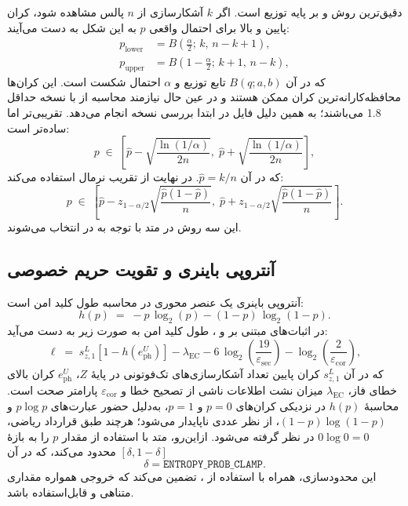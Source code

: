  دقیق‌ترین روش و بر پایه توزیع  است. اگر $k$ آشکارسازی از $n$ پالس مشاهده شود، کران پایین و بالا برای احتمال واقعی $p$ به این شکل به دست می‌آیند:
\begin{align}
	p_{\text{lower}} &= B\!\left(\frac{\alpha}{2};\, k,\, n-k+1\right), \\
	p_{\text{upper}} &= B\!\left(1-\frac{\alpha}{2};\, k+1,\, n-k\right),
\end{align}
که در آن $B(q; a, b)$ تابع  توزیع  و $\alpha$ احتمال شکست است. این کران‌ها محافظه‌کارانه‌ترین کران ممکن هستند و در عین حال نیازمند محاسبه  از  با نسخه حداقل 1.8 می‌باشند؛ به همین دلیل فایل در ابتدا بررسی نسخه انجام می‌دهد.  تقریبی‌تر اما ساده‌تر است:
\begin{equation}
	p \;\in\; \left[\hat{p} - \sqrt{\frac{\ln(1/\alpha)}{2n}},\; \hat{p} + \sqrt{\frac{\ln(1/\alpha)}{2n}}\right],
\end{equation}
که در آن $\hat{p} = k/n$. در نهایت  از تقریب نرمال استفاده می‌کند:
\begin{equation}
	p \;\in\; \left[\hat{p} - z_{1-\alpha/2}\sqrt{\frac{\hat{p}(1-\hat{p})}{n}},\; \hat{p} + z_{1-\alpha/2}\sqrt{\frac{\hat{p}(1-\hat{p})}{n}}\right].
\end{equation}
این سه روش در متد  با توجه به  در  انتخاب می‌شوند.

\subsection{آنتروپی باینری و تقویت حریم خصوصی}

آنتروپی باینری  یک عنصر محوری در محاسبه طول کلید امن است:
\begin{equation}
	h(p) \;=\; -p\,\log_2(p) - (1-p)\,\log_2(1-p).
\end{equation}
در اثبات‌های مبتنی بر  و ، طول کلید امن به صورت زیر به دست می‌آید:
\begin{equation}
	\ell \;=\; s_{z,1}^L\left[1 - h\!\left(e_{\text{ph}}^U\right)\right] - \lambda_{\text{EC}} - 6\,\log_2\!\left(\frac{19}{\varepsilon_{\text{sec}}}\right) - \log_2\!\left(\frac{2}{\varepsilon_{\text{cor}}}\right),
\end{equation}
که در آن $s_{z,1}^{L}$ کران پایین تعداد آشکارسازی‌های تک‌فوتونی در پایهٔ $Z$، $e_{\mathrm{ph}}^{U}$ کران بالای خطای فاز، $\lambda_{\mathrm{EC}}$ میزان نشت اطلاعات ناشی از تصحیح خطا و $\varepsilon_{\mathrm{cor}}$ پارامتر صحت است. محاسبهٔ $h(p)$ در نزدیکی کران‌های $p = 0$ و $p = 1$، به‌دلیل حضور عبارت‌های $p\log p$ و $(1-p)\log(1-p)$، از نظر عددی ناپایدار می‌شود؛ هرچند طبق قرارداد ریاضی، $0\log 0 = 0$ در نظر گرفته می‌شود. ازاین‌رو، متد  با استفاده از  مقدار $p$ را به بازهٔ $[\delta, 1-\delta]$ محدود می‌کند، که در آن
\[
\delta = \texttt{ENTROPY\_PROB\_CLAMP}.
\]
این محدودسازی، همراه با استفاده از ، تضمین می‌کند که خروجی همواره مقداری متناهی و قابل‌استفاده باشد.


